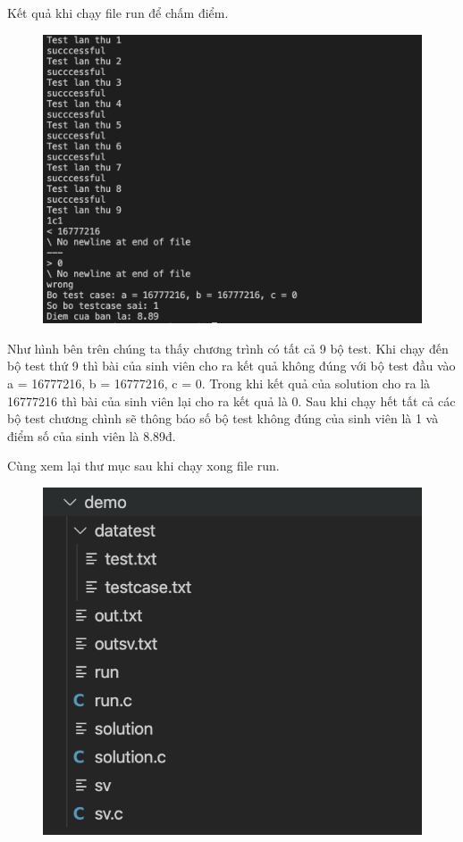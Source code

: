 \documentclass[12pt,a4paper]{report}
\begin{document}
Kết quả khi chạy file run để chấm điểm.

\begin{figure}[ht]
\begin{center}
\includegraphics[scale=.3]{hinhanh/ketquademo.png}
\end{center}
\end{figure}

Như hình bên trên chúng ta thấy chương trình có tất cả 9 bộ test. Khi chạy đến bộ test thứ 9 thì bài của sinh viên cho ra kết  quả không đúng với bộ test đầu vào a = 16777216, b = 16777216, c = 0. Trong khi kết quả của solution cho ra là 16777216 thì bài của sinh viên lại cho ra kết quả là 0. Sau khi chạy hết tất cả các bộ test chương chình sẽ thông báo số bộ test không đúng của sinh viên là 1 và điểm số của sinh viên là 8.89đ.
\newpage

Cùng xem lại thư mục sau khi chạy xong file run.

\begin{figure}[ht]
\begin{center}
\includegraphics[scale=.3]{hinhanh/cautrucsauchayrun.png}
\end{center}
\end{figure}
\end{document}

